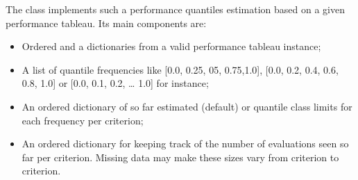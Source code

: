 \documentclass[a4paper,12pt,english]{sphinxhowto}
\begin{document}
The  class implements such a performance quantiles estimation based on a given performance tableau. Its main components are:
\begin{itemize}
\item {} 
Ordered  and a  dictionaries from a valid performance tableau instance;

\item {} 
A list  of quantile frequencies like  {[}0.0, 0.25, 05, 0.75,1.0{]},  {[}0.0, 0.2, 0.4, 0.6, 0.8, 1.0{]} or  {[}0.0, 0.1, 0.2, … 1.0{]} for instance;

\item {} 
An ordered  dictionary  of so far estimated  (default) or  quantile class limits for each frequency per criterion;

\item {} 
An ordered dictionary  for keeping track of the number of evaluations seen so far per criterion. Missing data may make these sizes vary from criterion to criterion.

\end{itemize}
\end{document}

